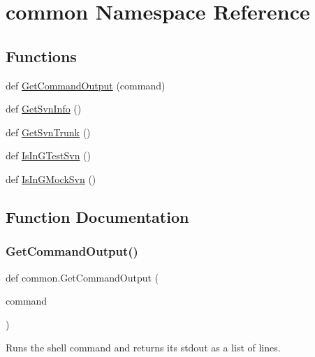 \hypertarget{namespacecommon}{}\section{common Namespace Reference}
\label{namespacecommon}
\subsection*{Functions}
\begin{DoxyCompactItemize}
\item 
def \mbox{\hyperlink{namespacecommon_ac1337758ae23f6a91b44de07408791da}{Get\+Command\+Output}} (command)
\item 
def \mbox{\hyperlink{namespacecommon_a312d07161b76d965fee6a61e464e283f}{Get\+Svn\+Info}} ()
\item 
def \mbox{\hyperlink{namespacecommon_a9e6483972a8dc0a6a274cbcee69564b0}{Get\+Svn\+Trunk}} ()
\item 
def \mbox{\hyperlink{namespacecommon_af29dcab2d7b4a9dd846446a0987ab387}{Is\+In\+G\+Test\+Svn}} ()
\item 
def \mbox{\hyperlink{namespacecommon_a8219bb529336fc3f0ef8222a5ed48222}{Is\+In\+G\+Mock\+Svn}} ()
\end{DoxyCompactItemize}


\subsection{Function Documentation}
\mbox{\label{namespacecommon_ac1337758ae23f6a91b44de07408791da}} 
\subsubsection{\texorpdfstring{GetCommandOutput()}{GetCommandOutput()}}
{\footnotesize\ttfamily def common.\+Get\+Command\+Output (\begin{DoxyParamCaption}\item[{}]{command }\end{DoxyParamCaption})}

\begin{DoxyVerb}Runs the shell command and returns its stdout as a list of lines.\end{DoxyVerb}
 \mbox{\label{namespacecommon_a312d07161b76d965fee6a61e464e283f}} 
